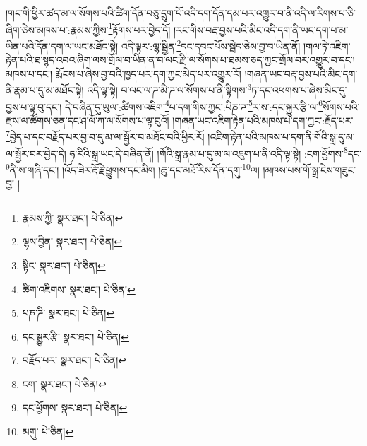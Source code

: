 །གང་གི་ཕྱིར་ཚད་མ་ལ་སོགས་པའི་ཚིག་དོན་བཅུ་དྲུག་པོ་འདི་དག་དོན་དམ་པར་འགྱུར་བ་ནི་འདི་ལ་རིགས་པ་ཅི་ཞིག་ཅེས་མཁས་པ་:རྣམས་ཀྱིས་\footnote{རྣམས་ཀྱི་  སྣར་ཐང་།  པེ་ཅིན། }རྟོགས་པར་བྱེད་དོ། །རང་གིས་བརྡ་བྱས་པའི་མིང་འདི་དག་ནི་ཡང་དག་པ་མ་ཡིན་པའི་དོན་དག་ལ་ཡང་མཐོང་སྟེ། འདི་ལྟར་:ལྷ་སྦྱིན་\footnote{ལྷས་བྱིན་  སྣར་ཐང་།  པེ་ཅིན། }དང་དབང་པོས་སྦེད་ཅེས་བྱ་བ་ཡིན་ནོ། །གལ་ཏེ་འཇིག་རྟེན་པའི་ཐ་སྙད་འབའ་ཞིག་ལས་གྲོལ་བ་ཡིན་ན་བ་ལང་རྫི་ལ་སོགས་པ་ཐམས་ཅད་ཀྱང་གྲོལ་བར་འགྱུར་བ་དང་། མཁས་པ་དང་། རྨོངས་པ་ཞེས་བྱ་བའི་ཁྱད་པར་དག་ཀྱང་མེད་པར་འགྱུར་རོ། །གཞན་ཡང་བརྡ་བྱས་པའི་མིང་དག་ནི་རྣམ་པ་དུ་མ་མཐོང་སྟེ། འདི་ལྟ་སྟེ། བ་ལང་ལ་ཌ་མི་ཌ་ལ་སོགས་པ་ནི་སྟིགས་\footnote{སྟིང་  སྣར་ཐང་།  པེ་ཅིན། }ཏ་དང་འཕགས་པ་ཞེས་མིང་དུ་བྱས་པ་ལྟ་བུ་དང་། དེ་བཞིན་དུ་ཡུལ་:ཚིགས་འཇིག་\footnote{ཚིག་འཇིགས་  སྣར་ཐང་།  པེ་ཅིན། }པ་དག་གིས་ཀྱང་:པིཎ་ཌ་\footnote{པཎ་ཌི་  སྣར་ཐང་།  པེ་ཅིན། }ར་ས་:དང་སྐྱུར་རྩི་ལ་\footnote{དང་སྒྱུར་རྩི་  སྣར་ཐང་།  པེ་ཅིན། }སོགས་པའི་རྫས་ལ་ཚོགས་ཅན་དང་ཤ་ལོ་ཀ་ལ་སོགས་པ་ལྟ་བུའོ། །གཞན་ཡང་འཇིག་རྟེན་པའི་མཁས་པ་དག་ཀྱང་:རྗོད་པར་\footnote{བརྗོད་པར་  སྣར་ཐང་།  པེ་ཅིན། }བྱེད་པ་དང་བརྗོད་པར་བྱ་བ་དུ་མ་ལ་སྦྱོར་བ་མཐོང་བའི་ཕྱིར་རོ། །འཇིག་རྟེན་པའི་མཁས་པ་དག་ནི་གོའི་སྒྲ་དུ་མ་ལ་སྦྱོར་བར་བྱེད་དེ། ཧ་རིའི་སྒྲ་ཡང་དེ་བཞིན་ནོ། །གོའི་སྒྲ་རྣམ་པ་དུ་མ་ལ་འཇུག་པ་ནི་འདི་ལྟ་སྟེ། :ངག་ཕྱོགས་\footnote{ངག་  སྣར་ཐང་།  པེ་ཅིན། }དང་\footnote{དང་ཕྱོགས་  སྣར་ཐང་།  པེ་ཅིན། }ནི་ས་གཞི་དང་། །འོད་ཟེར་རྡོ་རྗེ་ཕྱུགས་དང་མིག །ཆུ་དང་མཐོ་རིས་དོན་དགུ་\footnote{མགུ་  པེ་ཅིན། }ལ། །མཁས་པས་གོ་སྒྲ་ངེས་གཟུང་བྱ། །

